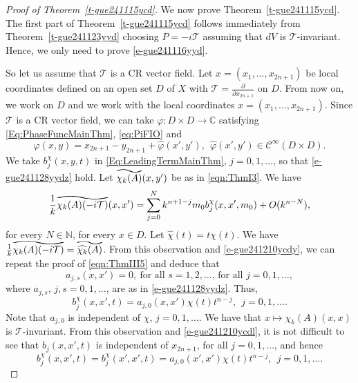 \documentclass[12pt]{amsart}
\theoremstyle{definition}
\theoremstyle{named}
\numberwithin{equation}{subsection}
\newcommand{\C}{\mathbb{C}}
\newcommand{\pr}{\partial}
\def\cC{\mathscr{C}}
\newcommand\reallywidetilde[1]{\ThisStyle{%
  \setbox0=\hbox{$\SavedStyle#1$}%
  \stackengine{-.1\LMpt}{$\SavedStyle#1$}{%
    \stretchto{\scaleto{\SavedStyle\mkern.2mu\AC}{.5150\wd0}}{.6\ht0}%
  }{O}{c}{F}{T}{S}%
}}
\begin{document}
\begin{proof}[Proof of Theorem~\ref{t-gue241115ycd}]

 We now prove Theorem~\ref{t-gue241115ycd}. The first part of Theorem~\ref{t-gue241115ycd} follows immediately from Theorem~\ref{t-gue241123yyd} choosing \(P=-i\mathcal{T}\) assuming that \(dV\) is \(\mathcal{T}\)-invariant. Hence, we only need to prove \eqref{e-gue241116yyd}. 

So let us assume that $\mathcal{T}$ is a CR vector field. Let $x=(x_1,\ldots,x_{2n+1})$ be local coordinates defined on an open set $D$ of $X$ with $\mathcal{T}=\frac{\pr}{\pr x_{2n+1}}$ on $D$. From now on, we work on $D$ and we work with the local coordinates $x=(x_1,\ldots,x_{2n+1})$. Since $\mathcal{T}$ is a CR vector field, we can take $\varphi:D\times D\to\C$ satisfying 
\eqref{Eq:PhaseFuncMainThm}, \eqref{eq:PiFIO} and 
\begin{equation}\label{e-gue241210yyd}
\varphi(x,y)=x_{2n+1}-y_{2n+1}+\hat\varphi(x',y'),\ \ \hat\varphi(x',y')\in\cC^\infty(D\times D).
\end{equation}
We take $b^\chi_j(x,y,t)$ in \eqref{Eq:LeadingTermMainThm}, $j=0,1,\ldots$, so that \eqref{e-gue241128yydz} hold. 
Let $\reallywidetilde{\chi_k(A)}(x,y')$ be as in \eqref{eqn:ThmI3}. We have 
\begin{equation}\label{e-gue241210ycdy}
        \frac{1}{k}\reallywidetilde{\chi_k(A)(-i\mathcal{T})}(x,x')= \sum^{N}_{j=0}k^{n+1-j}m_0b^\chi_j(x,x',m_0)+O(k^{n-N}),
    \end{equation}
    for every $N\in\mathbb N$, for every $x\in D$. 
Let $\widehat{\chi}(t)=t\chi(t).$ We have $\frac{1}{k}\reallywidetilde{\chi_k(A)(-i\mathcal{T})}=\reallywidetilde{\widehat{\chi_k}(A)}$. From this observation and \eqref{e-gue241210ycdy}, we can repeat the proof of \eqref{eqn:ThmIII5} and deduce that 
\begin{equation}\label{e-gue241210ycdk}
a_{j,s}(x,x')=0, \ \mbox{for all $s=1,2,\ldots$, for all $j=0,1,\ldots$}, 
\end{equation}
where $a_{j,s}$, $j, s=0,1,\ldots$, are as in \eqref{e-gue241128yydz}. Thus, 
\begin{equation}\label{e-gue241210ycdl}
b^\chi_j(x,x',t)=a_{j,0}(x,x')\chi(t)t^{n-j},\ \ j=0,1,\ldots.
\end{equation}
Note that $a_{j,0}$ is independent of $\chi$, $j=0,1,\ldots$.
We have that $x\mapsto\chi_k(A)(x,x)$ is $\mathcal{T}$-invariant. From this observation and \eqref{e-gue241210ycdl}, it is not difficult to see that $b_j(x,x',t)$ is independent of $x_{2n+1}$, for all $j=0,1,\ldots$, and hence 
\begin{equation}\label{e-gue241210ycdm}
b^\chi_j(x,x',t)=b^\chi_j(x',x',t)=a_{j,0}(x',x')\chi(t)t^{n-j},\ \ j=0,1,\ldots.
\end{equation} 


\end{proof}
\end{document}
